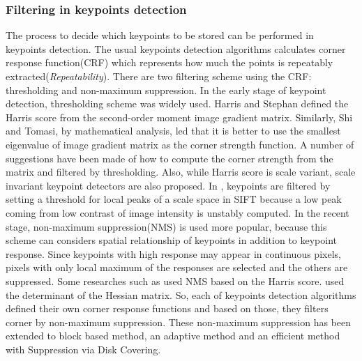 \subsubsection{Filtering in keypoints detection}
The process to decide which keypoints to be stored can be performed in keypoints detection. The usual keypoints detection algorithms calculates corner response function(CRF) which represents how much the points is repeatably extracted(\textit{Repeatability}). There are two filtering scheme using the CRF: thresholding and non-maximum suppression. In the early stage of keypoint detection, thresholding scheme was widely used. Harris and Stephan\cite{harris_combined_1988} defined the Harris score from the second-order moment image gradient matrix. Similarly, Shi and Tomasi\cite{shi_good_1994}, by mathematical analysis, led that it is better to use the smallest eigenvalue of image gradient matrix as the corner strength function. A number of suggestions\cite{noble_descriptions_1989,kenney_condition_2003} have been made of how to compute the corner strength from the matrix and filtered by thresholding. Also, while Harris score is scale variant, scale invariant keypoint detectors are also proposed. In \cite{foo_pruning_2007}, keypoints are filtered by setting a threshold for local peaks of a scale space in SIFT because a low peak coming from low contrast of image intensity is unstably computed. 
In the recent stage, non-maximum suppression(NMS) is used more popular, because this scheme can considers spatial relationship of keypoints in addition to keypoint response. Since keypoints with high response may appear in continuous pixels, pixels with only local maximum of the responses are selected and the others are suppressed. Some researches such as \cite{lowe_distinctive_2004,rublee_orb:_2011,mikolajczyk_indexing_2001} used NMS based on the Harris score. \cite{bay_speeded-up_2008} used the determinant of the Hessian matrix. So, each of keypoints detection algorithms defined their own corner response functions and based on those, they filters corner by non-maximum suppression. These non-maximum suppression has been extended to block based method\cite{neubeck_efficient_2006}, an adaptive method\cite{brown_multi-image_2005} and an efficient method with Suppression via Disk Covering\cite{gauglitz_efficiently_2011}.

